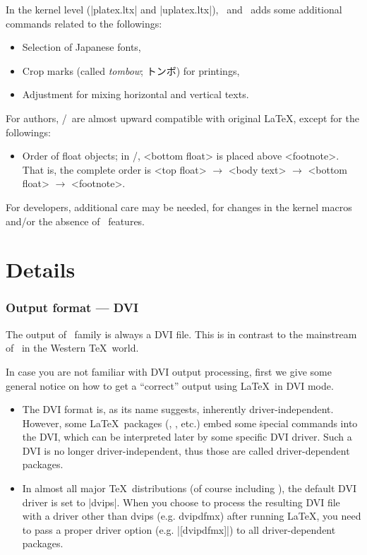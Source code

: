\documentclass[a4paper,11pt,dvipdfmx]{article}
\def\Foreign#1{\textit{#1}}
\begin{document}
In the kernel level (|platex.ltx| and |uplatex.ltx|),
\pLaTeX\ and \upLaTeX\ adds some additional commands
related to the followings:
\begin{itemize}
  \item Selection of Japanese fonts,
  \item Crop marks (called \Foreign{tombow}; トンボ) for printings,
  \item Adjustment for mixing horizontal and vertical texts.
\end{itemize}
For authors, \pLaTeX/\upLaTeX\ are almost upward compatible with
original \LaTeX, except for the followings:
\begin{itemize}
  \item Order of float objects; in \pLaTeX/\upLaTeX,
    <bottom float> is placed above <footnote>.
    That is, the complete order is
    <top float> $\rightarrow$ <body text> $\rightarrow$
    <bottom float> $\rightarrow$ <footnote>.
\end{itemize}
For developers, additional care may be needed,
for changes in the kernel macros and/or the absence of \pdfTeX\ features.


\newpage


\part{Details}%

\section{Output format --- DVI}

The output of \pTeX\ family is always a DVI file.
This is in contrast to the mainstream of \pdfTeX\ in the Western \TeX\ world.

In case you are not familiar with DVI output processing,
first we give some general notice on how to get a ``correct'' output
using \LaTeX\ in DVI mode.

\begin{itemize}
  \item The DVI format is, as its name suggests, inherently driver-independent.
    However, some \LaTeX\ packages (, ,  etc.)
    embed some \.{special} commands into the DVI, which can be interpreted later
    by some specific DVI driver.
    Such a DVI is no longer driver-independent, thus those are called
    driver-dependent packages.
  \item In almost all major \TeX\ distributions (of course including \TL),
    the default DVI driver is set to |dvips|.
    When you choose to process the resulting DVI file with a driver
    other than dvips (e.g. dvipdfmx) after running \LaTeX,
    you need to pass a proper driver option (e.g. |[dvipdfmx]|) to
    all driver-dependent packages.
\end{itemize}
\end{document}
